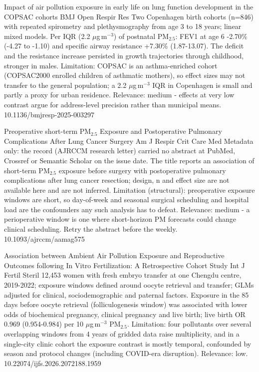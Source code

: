 \documentclass[10pt]{article}
\begin{document}
{Impact of air pollution exposure in early life on lung function development in the COPSAC cohorts}
{BMJ Open Respir Res}
{Two Copenhagen birth cohorts (n=846) with repeated spirometry and plethysmography from age 3 to 18 years; linear mixed models. Per IQR (2.2 $\mu$g\,m$^{-3}$) of postnatal PM$_{2.5}$: FEV1 at age 6 -2.70\% (-4.27 to -1.10) and specific airway resistance +7.30\% (1.87-13.07). The deficit and the resistance increase persisted in growth trajectories through childhood, stronger in males. Limitation: COPSAC is an asthma-enriched cohort (COPSAC2000 enrolled children of asthmatic mothers), so effect sizes may not transfer to the general population; a 2.2 $\mu$g\,m$^{-3}$ IQR in Copenhagen is small and partly a proxy for urban residence. Relevance: medium - effects at very low contrast argue for address-level precision rather than municipal means.}
{10.1136/bmjresp-2025-003297}

{Preoperative short-term PM$_{2.5}$ Exposure and Postoperative Pulmonary Complications After Lung Cancer Surgery}
{Am J Respir Crit Care Med}
{Metadata only: the record (AJRCCM research letter) carried no abstract at PubMed, Crossref or Semantic Scholar on the issue date. The title reports an association of short-term PM$_{2.5}$ exposure before surgery with postoperative pulmonary complications after lung cancer resection; design, n and effect size are not available here and are not inferred. Limitation (structural): preoperative exposure windows are short, so day-of-week and seasonal surgical scheduling and hospital load are the confounders any such analysis has to defeat. Relevance: medium - a perioperative window is one where short-horizon PM forecasts could change clinical scheduling. Retry the abstract before the weekly.}
{10.1093/ajrccm/aamag575}

\par{}\baselineskip{}\baselineskip
{}

{Association between Ambient Air Pollution Exposure and Reproductive Outcomes following In Vitro Fertilization: A Retrospective Cohort Study}
{Int J Fertil Steril}
{12,453 women with fresh embryo transfer at one Chengdu centre, 2019-2022; exposure windows defined around oocyte retrieval and transfer; GLMs adjusted for clinical, sociodemographic and paternal factors. Exposure in the 85 days before oocyte retrieval (folliculogenesis window) was associated with lower odds of biochemical pregnancy, clinical pregnancy and live birth; live birth OR 0.969 (0.954-0.984) per 10 $\mu$g\,m$^{-3}$ PM$_{2.5}$. Limitation: four pollutants over several overlapping windows from 4 years of gridded data raise multiplicity, and in a single-city clinic cohort the exposure contrast is mostly temporal, confounded by season and protocol changes (including COVID-era disruption). Relevance: low.}
{10.22074/ijfs.2026.2072188.1959}
\end{document}
